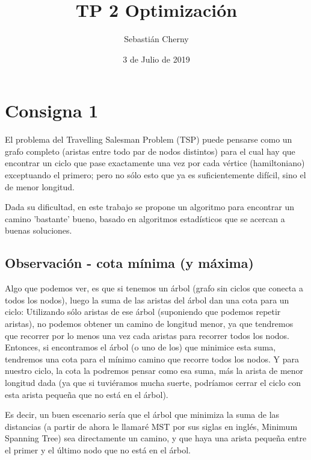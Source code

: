\documentclass{article}
\title{TP 2 Optimización}
\author{Sebastián Cherny}
\date{3 de Julio de 2019}
\begin{document}
\maketitle

\section{Consigna 1}
El problema del Travelling Salesman Problem (TSP) puede pensarse como un grafo completo (aristas entre todo par de nodos distintos) para el cual hay que encontrar un ciclo que pase exactamente una vez por cada vértice (hamiltoniano) exceptuando el primero; pero no sólo esto que ya es suficientemente difícil, sino el de menor longitud.

Dada su dificultad, en este trabajo se propone un algoritmo para encontrar un camino 'bastante' bueno, basado en algoritmos estadísticos que se acercan a buenas soluciones.

\subsection{Observación - cota mínima (y máxima)}
Algo que podemos ver, es que si tenemos un árbol (grafo sin ciclos que conecta a todos los nodos), luego la suma de las aristas del árbol dan una cota para un ciclo: Utilizando sólo aristas de ese árbol (suponiendo que podemos repetir aristas), no podemos obtener un camino de longitud menor, ya que tendremos que recorrer por lo menos una vez cada aristas para recorrer todos los nodos. Entonces, si encontramos el árbol (o uno de los) que minimice esta suma, tendremos una cota para el mínimo camino que recorre todos los nodos. Y para nuestro ciclo, la cota la podremos pensar como esa suma, más la arista de menor longitud dada (ya que si tuviéramos mucha suerte, podríamos cerrar el ciclo con esta arista pequeña que no está en el árbol).

Es decir, un buen escenario sería que el árbol que minimiza la suma de las distancias (a partir de ahora le llamaré MST por sus siglas en inglés, Minimum Spanning Tree) sea directamente un camino, y que haya una arista pequeña entre el primer y el último nodo que no está en el árbol.
\\
\\
\end{document}
